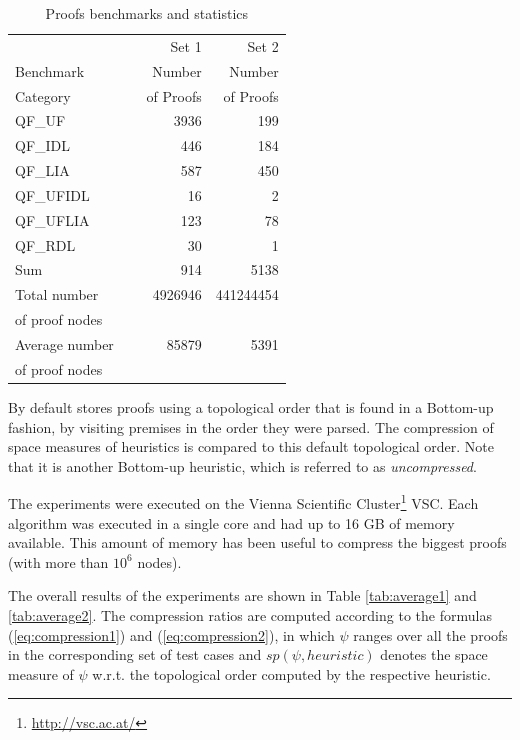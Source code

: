 \documentclass{llncs}
\begin{document}
 \begin{table}[tb]
   \caption{Proofs benchmarks and statistics}
   \label{tab:benchmarks}
   \centering
   \begin{tabular}{l|r|r}
     \toprule
		            &  Set 1 & Set 2 \\
     Benchmark~ &  Number & Number\\
     Category   & ~of Proofs	 & ~of Proofs\\
     \midrule
     QF\_UF      & 3936 & 199\\
     QF\_IDL     &  446 & 184\\
     QF\_LIA     &  587 & 450\\
     QF\_UFIDL   &  16  & 2\\
     QF\_UFLIA   &  123 & 78\\
     QF\_RDL     &   30 & 1\\
     \midrule
		 Sum         & 914  & 5138\\
		 Total number~ & 4926946 & 441244454 \\
		 of proof nodes & & \\
		 Average number ~ & 85879 & 5391 \\
		 of proof nodes & & \\
		\bottomrule
   \end{tabular}
 \end{table}

By default \skeptik stores proofs using a topological order that is found in a Bottom-up fashion, by visiting premises in the order they were parsed.
The compression of space measures of heuristics is compared to this default topological order.
Note that it is another Bottom-up heuristic, which is referred to as \emph{uncompressed}.


The experiments were executed on the Vienna Scientific Cluster\footnote{\url{http://vsc.ac.at/}}
VSC. Each algorithm was executed in a single core and had up to 16 GB of memory available. 
This amount of memory has been useful to compress the biggest proofs (with more than $10^6$ nodes).

The overall results of the experiments are shown in Table \ref{tab:average1} and \ref{tab:average2}. The compression ratios
are computed according to the formulas (\ref{eq:compression1}) and (\ref{eq:compression2}), in which $\psi$
ranges over all the proofs in the corresponding set of test cases and $sp(\psi,heuristic)$ denotes the space measure of $\psi$ w.r.t. the topological order computed by the respective heuristic.
\end{document}
